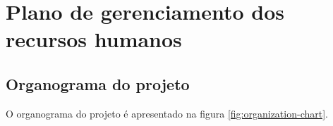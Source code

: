 
\chapter{Plano de gerenciamento dos recursos humanos}
\label{ch:human-resource-management-plan}



\section{Organograma do projeto}

O organograma do projeto é apresentado na figura \ref{fig:organization-chart}.

